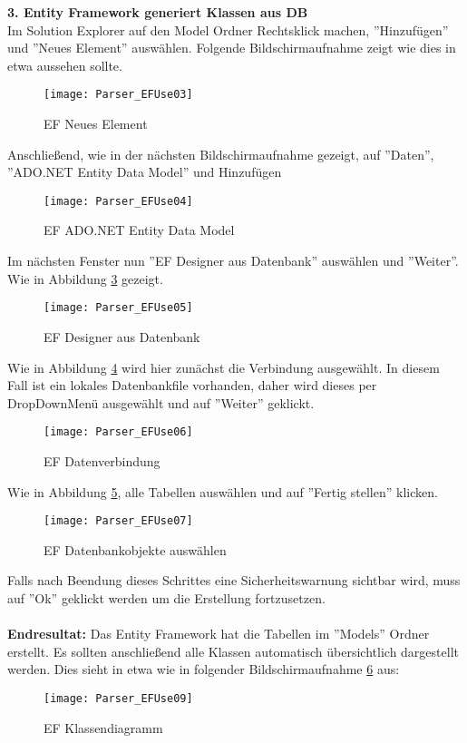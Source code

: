 \textbf{3. Entity Framework generiert Klassen aus DB} \\
Im Solution Explorer auf den Model Ordner Rechtsklick machen, ''Hinzufügen'' und ''Neues Element'' auswählen. Folgende Bildschirmaufnahme zeigt wie dies in etwa aussehen sollte.
\begin{figure}[H]
    \centering
    \texttt{[image: Parser\_EFUse03]}
    \caption{EF Neues Element}
    \label{fig:parsef03}
\end{figure} 
Anschließend, wie in der nächsten Bildschirmaufnahme gezeigt, auf ''Daten'', ''ADO.NET Entity Data Model'' und Hinzufügen
\begin{figure}[H]
    \centering
    \texttt{[image: Parser\_EFUse04]}
    \caption{EF ADO.NET Entity Data Model}
    \label{fig:parsef04}
\end{figure} 
Im nächsten Fenster nun  ''EF Designer aus Datenbank'' auswählen und ''Weiter''. Wie in Abbildung \ref{fig:parsef05} gezeigt.
\begin{figure}[H]
    \centering
    \texttt{[image: Parser\_EFUse05]}
    \caption{EF Designer aus Datenbank}
    \label{fig:parsef05}
\end{figure} 
Wie in Abbildung \ref{fig:parsef06} wird hier zunächst die Verbindung ausgewählt. In diesem Fall ist ein lokales Datenbankfile vorhanden, daher wird dieses per DropDownMenü ausgewählt und auf ''Weiter'' geklickt. 
\begin{figure}[H]
    \centering
    \texttt{[image: Parser\_EFUse06]}
    \caption{EF Datenverbindung}
    \label{fig:parsef06}
\end{figure} 
Wie in Abbildung \ref{fig:parsef07}, alle Tabellen auswählen und auf ''Fertig stellen'' klicken. 
\begin{figure}[H]
    \centering
    \texttt{[image: Parser\_EFUse07]}
    \caption{EF Datenbankobjekte auswählen}
    \label{fig:parsef07}
\end{figure} 
Falls nach Beendung dieses Schrittes eine Sicherheitswarnung sichtbar wird, muss auf ''Ok'' geklickt werden um die Erstellung fortzusetzen. \\ \\
\textbf{Endresultat:} Das Entity Framework hat die Tabellen im ''Models'' Ordner erstellt. Es sollten anschließend alle Klassen automatisch übersichtlich dargestellt werden. Dies sieht in etwa wie in folgender Bildschirmaufnahme \ref{fig:parsef09} aus:
\begin{figure}[H]
    \centering
    \texttt{[image: Parser\_EFUse09]}
    \caption{EF Klassendiagramm}
    \label{fig:parsef09}
\end{figure} 
